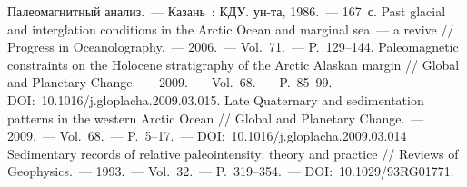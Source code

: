 \begin{thebibliography}{99}
\bibitem{} Палеомагнитный анализ.~--- Казань~: КДУ. ун-та, 1986.~--- 167~с.
\bibitem{} Past glacial and interglation conditions in the Arctic Ocean and marginal sea~--- a revive // Progress in Oceanolography.~--- 2006.~--- Vol.~71.~--- P.~129--144.
\bibitem{} Paleomagnetic constraints on the Holocene stratigraphy of the Arctic Alaskan margin // Global and Planetary Change.~--- 2009.~--- Vol.~68.~--- P.~85--99.~--- DOI:~10.1016/j.gloplacha.2009.03.015.
\bibitem{} Late Quaternary and sedimentation patterns in the western Arctic Ocean // Global and Planetary Change.~--- 2009.~--- Vol.~68.~--- P.~5--17.~--- DOI:~10.1016/j.gloplacha.2009.03.014
\bibitem{} Sedimentary records of relative paleointensity: theory and practice // Reviews of Geophysics.~--- 1993.~--- Vol.~32.~--- P.~319--354.~--- DOI:~10.1029/93RG01771.

\end{thebibliography}
\thispagestyle{empty}

